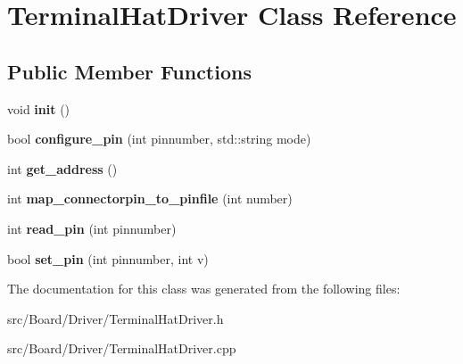 \hypertarget{classTerminalHatDriver}{}\section{Terminal\+Hat\+Driver Class Reference}
\label{classTerminalHatDriver}
\subsection*{Public Member Functions}
\begin{DoxyCompactItemize}
\item 
\mbox{\label{classTerminalHatDriver_a02f2ef534becf876c4afc817217a4059}} 
void {\bfseries init} ()
\item 
\mbox{\label{classTerminalHatDriver_a5bbe8069426a79518a553a8ff7bd76a7}} 
bool {\bfseries configure\+\_\+pin} (int pinnumber, std\+::string mode)
\item 
\mbox{\label{classTerminalHatDriver_a33a543c365032301ec094f647fe9072a}} 
int {\bfseries get\+\_\+address} ()
\item 
\mbox{\label{classTerminalHatDriver_aca4ec1d281399fbcb67b6359baed9ebf}} 
int {\bfseries map\+\_\+connectorpin\+\_\+to\+\_\+pinfile} (int number)
\item 
\mbox{\label{classTerminalHatDriver_a4253842c5325f157554afefe162db66c}} 
int {\bfseries read\+\_\+pin} (int pinnumber)
\item 
\mbox{\label{classTerminalHatDriver_a63133949220b5037c955ef5ce9105e62}} 
bool {\bfseries set\+\_\+pin} (int pinnumber, int v)
\end{DoxyCompactItemize}


The documentation for this class was generated from the following files\+:\begin{DoxyCompactItemize}
\item 
src/\+Board/\+Driver/Terminal\+Hat\+Driver.\+h\item 
src/\+Board/\+Driver/Terminal\+Hat\+Driver.\+cpp\end{DoxyCompactItemize}
